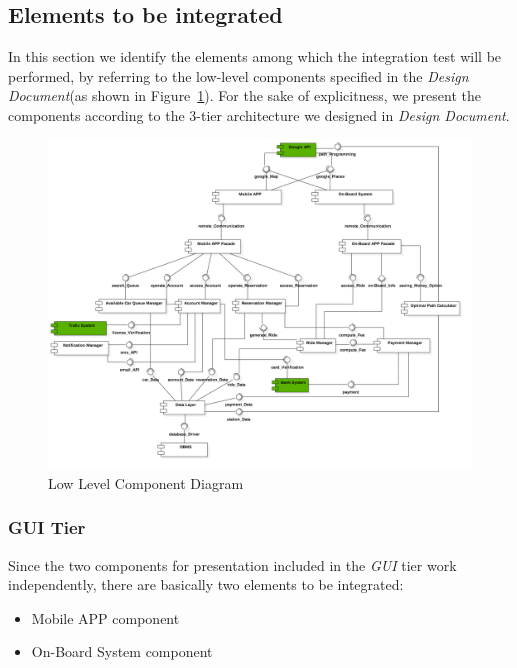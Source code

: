 \documentclass[a4paper,11pt]{article}
\begin{document}
	\subsection{Elements to be integrated}
	In this section we identify the elements among which the integration test will be performed, by referring to the low-level components specified in the \textsl{Design Document}(as shown in Figure~\ref{fig-low}). For the sake of explicitness, we present the components according to the 3-tier architecture we designed in \textsl{Design Document}.
		\begin{figure}[H]
   			\centering
  			\includegraphics[width=\textwidth]{images/low_level_CD}
  	    		\caption{Low Level Component Diagram}\label{fig-low}
		\end{figure}
		
		\subsubsection{GUI Tier}
		Since the two components for presentation included in the \textsl{GUI} tier work independently, there are basically two elements to be integrated:
		\begin{itemize}
			\item Mobile APP component
			\item On-Board System component
		\end{itemize}
\end{document}
